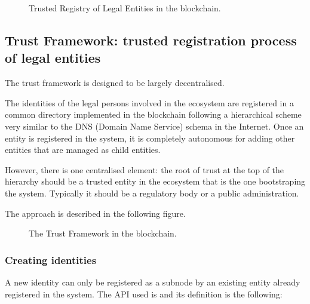\documentclass[letterpaper,10pt,english]{sphinxmanual}
\begin{document}
\begin{figure}[htbp]
\centering
\capstart

\noindent{}
\caption{Trusted Registry of Legal Entities in the blockchain.}\label{\detokenize{privacycred:id5}}\end{figure}


\subsection{Trust Framework: trusted registration process of legal entities}
\label{\detokenize{privacycred:trust-framework-trusted-registration-process-of-legal-entities}}
\sphinxAtStartPar
The trust framework is designed to be largely decentralised.

\sphinxAtStartPar
The identities of the legal persons involved in the ecosystem are registered in a common directory implemented in the blockchain following a hierarchical scheme very similar to the DNS (Domain Name Service) schema in the Internet. Once an entity is registered in the system, it is completely autonomous for adding other entities that are managed as child entities.

\sphinxAtStartPar
However, there is one centralised element: the root of trust at the top of the hierarchy should be a trusted entity in the ecosystem that is the one bootstraping the system. Typically it should be a regulatory body or a public administration.

\sphinxAtStartPar
The approach is described in the following figure.

\begin{figure}[htbp]
\centering
\capstart

\noindent{}
\caption{The Trust Framework in the blockchain.}\label{\detokenize{privacycred:id6}}\end{figure}


\subsubsection{Creating identities}
\label{\detokenize{privacycred:creating-identities}}
\sphinxAtStartPar
A new identity can only be registered as a sub\sphinxhyphen{}node by an existing entity already registered in the system. The API used is  and its definition is the following:
\end{document}
